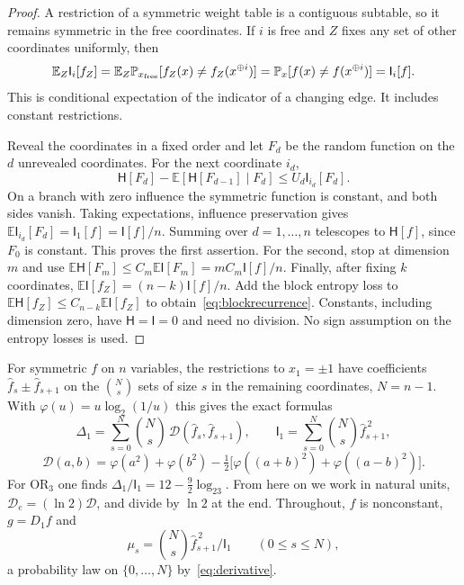 \documentclass[11pt]{amsart}
\theoremstyle{definition}
\theoremstyle{remark}
\newcommand{\E}{\mathbb E}
\renewcommand{\P}{\mathbb P}
\newcommand{\HH}{\mathsf H}
\newcommand{\I}{\mathsf I}
\newcommand{\wh}[1]{\widehat{#1}}
\begin{document}
\begin{proof}
A restriction of a symmetric weight table is a contiguous subtable, so it remains symmetric in the free coordinates. If $i$ is free and $Z$ fixes any set of other coordinates uniformly, then
\[
 \E_Z\I_i[f_Z]
 =\E_Z\P_{x_{\rm free}}[f_Z(x)\ne f_Z(x^{\oplus i})]
 =\P_x[f(x)\ne f(x^{\oplus i})]=\I_i[f].
\]
This is conditional expectation of the indicator of a changing edge. It includes constant restrictions.

Reveal the coordinates in a fixed order and let $F_d$ be the random function on the $d$ unrevealed coordinates. For the next coordinate $i_d$,
\[
 \HH[F_d]-\E[\HH[F_{d-1}]\mid F_d]\le U_d\I_{i_d}[F_d].
\]
On a branch with zero influence the symmetric function is constant, and both sides vanish. Taking expectations, influence preservation gives $\E\I_{i_d}[F_d]=\I_1[f]=\I[f]/n$. Summing over $d=1,\ldots,n$ telescopes to $\HH[f]$, since $F_0$ is constant. This proves the first assertion. For the second, stop at dimension $m$ and use $\E\HH[F_m]\le C_m\E\I[F_m]=mC_m\I[f]/n$. Finally, after fixing $k$ coordinates, $\E\I[f_Z]=(n-k)\I[f]/n$. Add the block entropy loss to $\E\HH[f_Z]\le C_{n-k}\E\I[f_Z]$ to obtain~\eqref{eq:blockrecurrence}. Constants, including dimension zero, have $\HH=\I=0$ and need no division. No sign assumption on the entropy losses is used.
\end{proof}

For symmetric $f$ on $n$ variables, the restrictions to $x_1=\pm1$ have coefficients $\wh f_s\pm\wh f_{s+1}$ on the $\binom Ns$ sets of size $s$ in the remaining coordinates, $N=n-1$. With $\varphi(u)=u\log_2(1/u)$ this gives the exact formulas
\begin{equation}\label{eq:delta}
 \Delta_1=\sum_{s=0}^{N}\binom Ns\,\mathcal D(\wh f_s,\wh f_{s+1}),\qquad \I_1=\sum_{s=0}^N\binom Ns\wh f_{s+1}^{\,2},
\end{equation}
\[
 \mathcal D(a,b)=\varphi(a^2)+\varphi(b^2)-\tfrac12\bigl[\varphi((a+b)^2)+\varphi((a-b)^2)\bigr].
\]
For $\mathrm{OR}_3$ one finds $\Delta_1/\I_1=12-\frac92\log_23$. From here on we work in natural units, $\mathcal D_e=(\ln2)\mathcal D$, and divide by $\ln2$ at the end. Throughout, $f$ is nonconstant, $g=D_1f$ and
\[
 \mu_s=\binom Ns\wh f_{s+1}^{\,2}/\I_1\qquad(0\le s\le N),
\]
a probability law on $\{0,\dots,N\}$ by~\eqref{eq:derivative}.
\end{document}
